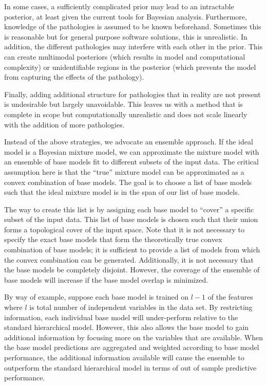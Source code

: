 \documentclass[12pt,titlepage]{mktg-article}
\begin{document}
In some cases, a sufficiently complicated prior may lead to an intractable posterior, at least given the current tools for Bayesian analysis. Furthermore, knowledge of the pathologies is assumed to be known beforehand. Sometimes this is reasonable but for general purpose software solutions, this is unrealistic. In addition, the different pathologies may interfere with each other in the prior. This can create multimodal posteriors (which results in model and computational complexity) or unidentifiable regions in the posterior (which prevents the model from capturing the effects of the pathology).

Finally, adding additional structure for pathologies that in reality are not present is undesirable but largely unavoidable. This leaves us with a method that is complete in scope but computationally unrealistic and does not scale linearly with the addition of more pathologies.

Instead of the above strategies, we advocate an ensemble approach. If the ideal model is a Bayesian mixture model, we can approximate the mixture model with an ensemble of base models fit to different subsets of the input data. The critical assumption here is that the ``true'' mixture model can be approximated as a convex combination of base models. The goal is to choose a list of base models such that the ideal mixture model is in the span of our list of base models.

The way to create this list is by assigning each base model to ``cover'' a specific subset of the input data. This list of base models is chosen such that their union forms a topological cover of the input space. Note that it is not necessary to specify the exact base models that form the theoretically true convex combination of base models; it is sufficient to provide a list of models from which the convex combination can be generated. Additionally, it is not necessary that the base models be completely disjoint. However, the coverage of the ensemble of base models will increase if the base model overlap is minimized.

By way of example, suppose each base model is trained on \(l-1\) of the features where \(l\) is total number of independent variables in the data set. By restricting information, each individual base model will under-perform relative to the standard hierarchical model. However, this also allows the base model to gain additional information by focusing more on the variables that are available. When the base model predictions are aggregated and weighted according to base model performance, the additional information available will cause the ensemble to outperform the standard hierarchical model in terms of out of sample predictive performance.
\end{document}
